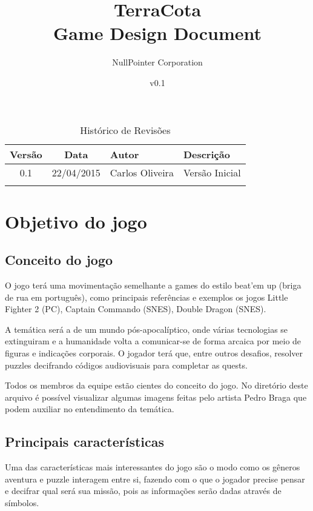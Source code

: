 \documentclass[12pt]{article}
\begin{document}
\title{TerraCota\\Game Design Document}
\author{NullPointer Corporation}
\date{v0.1}
\maketitle

\newpage

\begin{table}[h]
  \centering
  \begin{tabular}{ccll}
    \toprule
    \textbf{Versão} & \textbf{Data} & \textbf{Autor} & \textbf{Descrição} \\
    \midrule
    0.1 & 22/04/2015 & Carlos Oliveira  & Versão Inicial \\
    \rowcolor[gray]{0.9}
    \bottomrule
  \end{tabular}
  \caption{Histórico de Revisões}
\end{table}

\newpage

\tableofcontents

\newpage

\section{Objetivo do jogo}

\subsection{Conceito do jogo}
O jogo terá uma movimentação semelhante a games do estilo beat'em up (briga de
rua em português), como principais referências e exemplos os jogos Little
Fighter 2 (PC), Captain Commando (SNES), Double Dragon (SNES).

A temática será a de um mundo pós-apocalíptico, onde várias tecnologias se
extinguiram e a humanidade volta a comunicar-se de forma arcaica por meio de
figuras e indicações corporais. O jogador terá que, entre outros desafios,
resolver puzzles decifrando códigos audiovisuais para completar as quests.

Todos os membros da equipe estão cientes do conceito do jogo. No diretório
deste arquivo é possível visualizar algumas imagens feitas pelo artista Pedro
Braga que podem auxiliar no entendimento da temática.

\subsection{Principais características}
Uma das características mais interessantes do jogo são o modo como os gêneros
aventura e puzzle interagem entre si, fazendo com o que o jogador precise
pensar e decifrar qual será sua missão, pois as informações serão dadas
através de símbolos.
\end{document}
